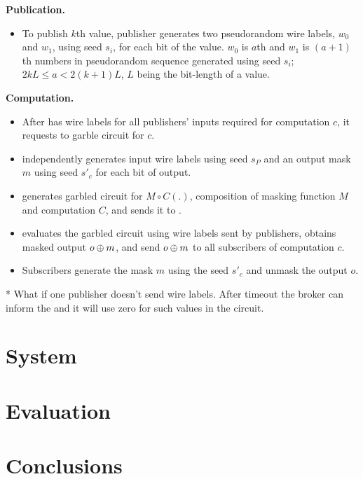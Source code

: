 \noindent\textbf{Publication.}
\begin{itemize}[leftmargin=*]
		
	\item To publish $k$th value, publisher generates two pseudorandom wire
	  labels, $w_0$ and $w_1$, using seed $s_i$, for each bit of the value.
	  $w_0$ is $a$th and $w_1$ is $(a+1)$th numbers in pseudorandom sequence
	  generated using seed $s_i$; $2kL \leq a < 2(k+1)L$, $L$ being the
	  bit-length of a value.

\end{itemize}

\noindent\textbf{Computation.}
\begin{itemize}[leftmargin=*]

  \item After \broker has wire labels for all publishers' inputs required for
	computation $c$, it requests \garbler to garble circuit for $c$.  
  
  \item \garbler independently generates input wire labels using seed $s_P$ and
	an output mask $m$ using seed $s'_c$ for each bit of output.

  \item \garbler generates garbled circuit for $M \circ C(.)$, composition of
	masking function $M$ and computation $C$, and sends it to \broker.

  \item \broker evaluates the garbled circuit using wire labels sent by
	publishers, obtains masked output $o \oplus m$, and send $o \oplus m$ to all
	subscribers of computation $c$.
  
  \item Subscribers generate the mask $m$ using the seed $s'_c$ and unmask the
	output $o$.

\end{itemize}


* What if one publisher doesn't send wire labels. After timeout the broker can inform the \garbler and it will use zero for such values in the circuit.

\section{System}

\section{Evaluation}

\section{Conclusions}


\begin{acks}
\end{acks}
